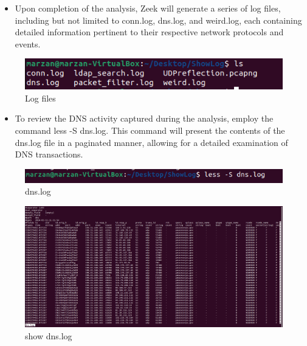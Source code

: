 \begin{itemize}
    \item Upon completion of the analysis, Zeek will generate a series of log files, including but not limited to conn.log, dns.log, and weird.log, each containing detailed information pertinent to their respective network protocols and events.
\end{itemize}


\begin{figure}[H]
    \centering
    \includegraphics[width=1\linewidth]{images/pcap/pcap_2.png}
    \caption{Log files}
    \label{fig:enter-label}
\end{figure}

\begin{itemize}
    \item To review the DNS activity captured during the analysis, employ the command less -S dns.log. This command will present the contents of the dns.log file in a paginated manner, allowing for a detailed examination of DNS transactions.
\end{itemize}


\begin{figure}[H]
    \centering
    \includegraphics[width=1\linewidth]{images/pcap/pcap_4.png}
    \caption{dns.log}
    \label{fig:enter-label}
\end{figure}


\begin{figure}[H]
    \centering
    \includegraphics[width=1\linewidth]{images/pcap/pcap_3.png}
    \caption{show dns.log}
    \label{fig:enter-label}
\end{figure}


